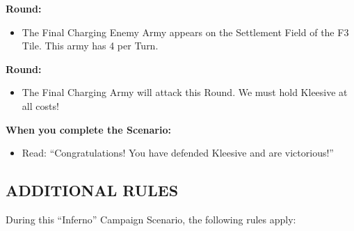\begin{multicols}{2}
\textbf{ Round:}
\begin{itemize}
  \item The Final Charging Enemy Army appears on the Settlement Field of the F3 Tile.
    This army has 4  per Turn.
\end{itemize}

\textbf{ Round:}
\begin{itemize}
  \item The Final Charging Army will attack this Round.
    We must hold Kleesive at all costs!
\end{itemize}

\textbf{When you complete the Scenario:}
\begin{itemize}
  \item Read: ``Congratulations! You have defended Kleesive and are victorious!''
\end{itemize}

\subsection*{\MakeUppercase{Additional Rules}}

During this ``Inferno'' Campaign Scenario, the following rules apply:


\end{multicols}
